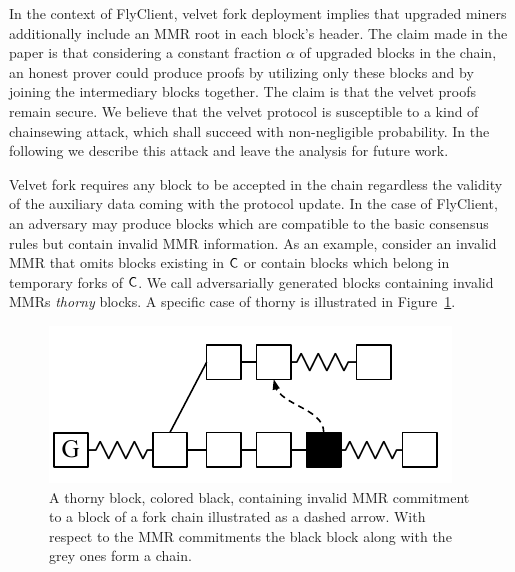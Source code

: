 	In the context of FlyClient, velvet fork deployment implies that upgraded miners additionally include an MMR root in each block's header. 
    The claim made in the paper is that considering a constant fraction $\alpha$ of upgraded blocks in the chain, an honest prover could produce proofs 
    by utilizing only these blocks and by joining the intermediary blocks together. 
    The claim is that the velvet proofs remain secure. We believe that the velvet protocol is susceptible to a kind of chainsewing attack, which shall succeed with non-negligible probability.
    In the following we describe this attack and leave the analysis for future work. 
	
	Velvet fork requires any block to be accepted in the chain regardless the validity of the auxiliary data coming with the protocol update. 
    In the case of FlyClient, an adversary may produce blocks which are compatible to the basic consensus rules but contain invalid MMR information. 
    As an example, consider an invalid MMR that omits blocks existing in $\mathsf{C}$ or contain blocks which belong in temporary forks of $\mathsf{C}$. 
    We call adversarially generated blocks containing invalid MMRs \emph{thorny} blocks. A specific case of thorny is illustrated in Figure~\ref{fig:thorny_flyclient}.

	\begin{figure}
		\begin{center}
			\includegraphics[width=0.7\columnwidth]{figures/false_interlink.pdf}
		\end{center}
		\caption{A thorny block, colored black, containing invalid MMR commitment to a block of a fork chain illustrated as a dashed arrow. With respect to the MMR commitments the black block along with the grey ones form a chain.}
		\label{fig:thorny_flyclient}
	\end{figure}
	

